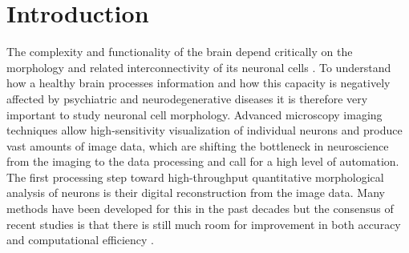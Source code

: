 \section{Introduction}
\label{ch2:sec:introduction}
The complexity and functionality of the brain depend critically on the morphology and related interconnectivity of its neuronal cells \cite{kandel2000principles, ascoli2002computational, donohue2008comparative}. To understand how a healthy brain processes information and how this capacity is negatively affected by psychiatric and neurodegenerative diseases \cite{anderton1998dendritic, lin2010mechanisms, vsivskova2014dendritic} it is therefore very important to study neuronal cell morphology. Advanced microscopy imaging techniques allow high-sensitivity visualization of individual neurons and produce vast amounts of image data, which are shifting the bottleneck in neuroscience from the imaging to the data processing \cite{svoboda2011past, peng2011proof, senft2011brief, halavi2012digital} and call for a high level of automation. The first processing step toward high-throughput quantitative morphological analysis of neurons is their digital reconstruction from the image data. Many methods have been developed for this in the past decades \cite{meijering2010neuron, donohue2011automated} but the consensus of recent studies is that there is still much room for improvement in both accuracy and computational efficiency \cite{liu2011diadem, svoboda2011past}.

